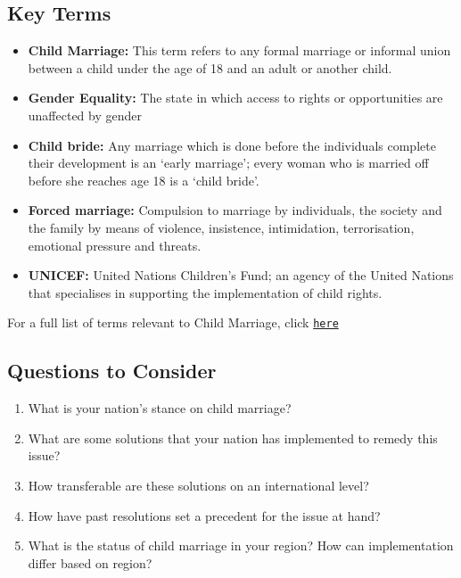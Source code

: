 \documentclass[10pt, letterpaper]{article}
\begin{document}
\subsection{Key Terms}
\begin{itemize}
\item 
\textbf{Child Marriage:} This term refers to any formal marriage or informal
union between a child under the age of 18 and an adult or another child.
\item 
\textbf{Gender Equality:} The state in which access to rights or opportunities
are unaffected by gender
\item 
\textbf{Child bride:} Any marriage which is done before the individuals complete
their development is an `early marriage'; every woman who is married off
before she reaches age 18 is a `child bride'.
\item 
\textbf{Forced marriage:} Compulsion to marriage by individuals, the society and
the family by means of violence, insistence, intimidation,
terrorisation, emotional pressure and threats.
\item 
\textbf{UNICEF:} United Nations Children's Fund; an agency of the United Nations
that specialises in supporting the implementation of child rights.
\end{itemize}

For a full list of terms relevant to Child Marriage, click
\texttt{\href{https://ilginyorulmaz.com/2017/07/06/child-marriage-key-concepts-and-glossary/}{{here}}}

\subsection{Questions to Consider}

\begin{enumerate}
\def\labelenumi{\arabic{enumi}.}
\item
  What is your nation's stance on child marriage?
\item
  
  What are some solutions that your nation has implemented to remedy
  this issue?
  
\item
  
  How transferable are these solutions on an international level?
  
\item
  
  How have past resolutions set a precedent for the issue at hand?
  
\item
  
  What is the status of child marriage in your region? How can
  implementation differ based on region?
  
\end{enumerate}
\end{document}
